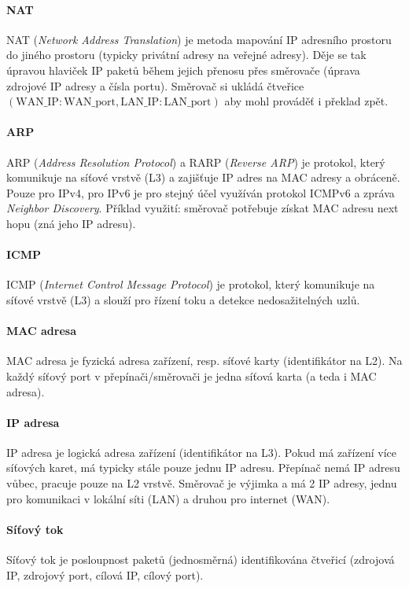 \paragraph*{NAT} NAT (\textit{Network Address Translation}) je metoda mapování IP adresního prostoru do jiného prostoru (typicky privátní adresy na veřejné adresy). Děje se tak úpravou hlaviček IP paketů během jejich přenosu přes směrovače (úprava zdrojové IP adresy a čísla portu). Směrovač si ukládá čtveřice $(\text{WAN\_IP}:\text{WAN\_port}, \text{LAN\_IP}:\text{LAN\_port})$ aby mohl prováděť i překlad zpět.

\paragraph*{ARP} ARP (\textit{Address Resolution Protocol}) a RARP (\textit{Reverse ARP}) je protokol, který komunikuje na síťové vrstvě (L3) a zajišťuje  IP adres na MAC adresy a obráceně. Pouze pro IPv4, pro IPv6 je pro stejný účel využíván protokol ICMPv6 a zpráva \textit{Neighbor Discovery}. Příklad využití: směrovač potřebuje získat MAC adresu next hopu (zná jeho IP adresu).

\paragraph*{ICMP} ICMP (\textit{Internet Control Message Protocol}) je protokol, který komunikuje na síťové vrstvě (L3) a slouží pro řízení toku a detekce nedosažitelných uzlů.

\paragraph*{MAC adresa} MAC adresa je fyzická adresa zařízení, resp. síťové karty (identifikátor na L2). Na každý síťový port v přepínači/směrovači je jedna síťová karta (a teda i MAC adresa).

\paragraph*{IP adresa} IP adresa je logická adresa zařízení (identifikátor na L3). Pokud má zařízení více síťových karet, má typicky stále pouze jednu IP adresu. Přepínač nemá IP adresu vůbec, pracuje pouze na L2 vrstvě. Směrovač je výjimka a má 2 IP adresy, jednu pro komunikaci v lokální síti (LAN) a druhou pro internet (WAN).

\paragraph*{Síťový tok} Síťový tok je posloupnost paketů (jednosměrná) identifikována čtveřicí (zdrojová IP, zdrojový port, cílová IP, cílový port).

